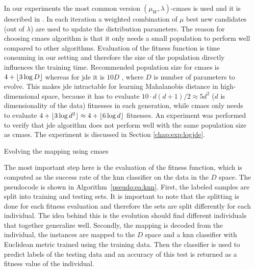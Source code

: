 \documentclass[12pt,a4paper]{report}
\begin{document}
In our experiments the most common version $(\mu_W, \lambda)$-\ac{cmaes} is used and it is described in \citep{hansen2001completely}. In each iteration a weighted combination of $\mu$ best new candidates (out of $\lambda$) are used to update the distribution parameters. The reason for choosing \ac{cmaes} algorithm is that it only needs a small population to perform well compared to other algorithms. Evaluation of the fitness function is time consuming in our setting and therefore the size of the population directly influences the training time. Recommended population size for \ac{cmaes} is $4+\lfloor3\log{D}\rfloor$ \citep{hansen2006cma} whereas for \ac{jde} it is $10D$ \citep{brest2006self}, where $D$ is number of parameters to evolve. This makes \ac{jde} intractable for learning Mahalanobis distance in high-dimensional space, because it has to evaluate $10\cdot d(d+1)/2 \approx 5d^2$ ($d$ is dimensionality of the data) fitnesses in each generation, while \ac{cmaes} only needs to evaluate $4+\lfloor3\log{d^2}\rfloor \approx 4+\lfloor6\log{d}\rfloor$ fitnesses. An experiment was performed to verify that \ac{jde} algorithm does not perform well with the same population size as \ac{cmaes}. The experiment is discussed in Section \ref{chap:exp:logjde}.

\begin{algorithm}[t]
\caption{Evolving the mapping using \ac{cmaes}} \label{pseudo:our-method}
\DontPrintSemicolon
\LinesNumbered
{}
\end{algorithm} 

The most important step here is the evaluation of the fitness function, which is computed as the success rate of the \ac{knn} classifier on the data in the $D$ space. The pseudocode is shown in Algorithm~\ref{pseudo:ea:knn}. First, the labeled samples are split into training and testing sets. It is important to note that the splitting is done for each fitness evaluation and therefore the sets are split differently for each individual. The idea behind this is the evolution should find different individuals that together generalize well. Secondly, the mapping is decoded from the individual, the instances are mapped to the $D$ space and a \ac{knn} classifier with Euclidean metric trained using the training data. Then the classifier is used to predict labels of the testing data and an accuracy of this test is returned as a fitness value of the individual.
\end{document}
